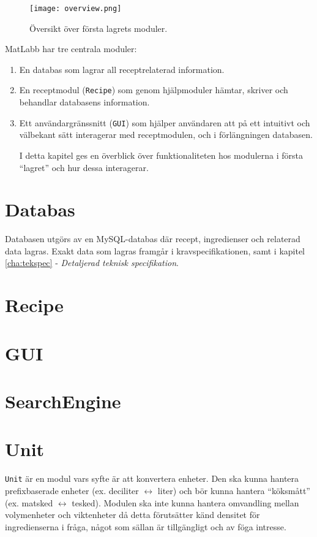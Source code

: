 
\begin{figure}[h]
\centering
\texttt{[image: overview.png]}
\caption{Översikt över första lagrets moduler.}
\label{fig:overview}
\end{figure}

MatLabb har tre centrala moduler: 
\begin{enumerate}
\item En databas som lagrar all receptrelaterad information.
\item En receptmodul (\verb=Recipe=) som genom hjälpmoduler hämtar, skriver och behandlar databasens information.
\item Ett användargränssnitt (\verb=GUI=) som hjälper användaren att på ett intuitivt och välbekant sätt interagerar med receptmodulen, och i förlängningen databasen.

I detta kapitel ges en överblick över funktionaliteten hos modulerna i första ``lagret'' och hur dessa interagerar.
\end{enumerate}

\section{Databas}\label{sec:ark.databas)}
Databasen utgörs av en MySQL-databas där recept, ingredienser och relaterad data lagras. Exakt data som lagras framgår i kravspecifikationen, samt i kapitel \ref{cha:tekspec} - \emph{Detaljerad teknisk specifikation}.

\section{Recipe}\label{sec:ark.recipe}

\section{GUI}\label{sec:ark.gui}

\section{SearchEngine}\label{sec:ark.search}

\section{Unit}\label{sec:ark.unit}
\verb=Unit= är en modul vars syfte är att konvertera enheter. Den ska kunna hantera prefixbaserade enheter (ex. deciliter $\leftrightarrow$ liter) och bör kunna hantera ``köksmått'' (ex. matsked $\leftrightarrow$ tesked). Modulen ska inte kunna hantera omvandling mellan volymenheter och viktenheter då detta förutsätter känd densitet för ingredienserna i fråga, något som sällan är tillgängligt och av föga intresse.

